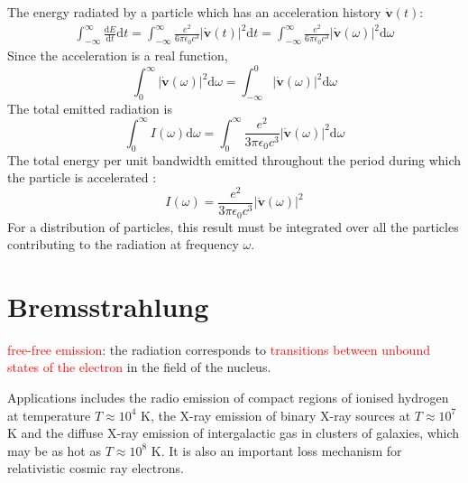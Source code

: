 \documentclass[12pt,a4paper]{article}
\renewcommand{\vec}[1]{\boldsymbol{#1}}
\newcommand{\dif}{\mathrm{d}}
\begin{document}
The energy radiated by a particle which has an acceleration history $\vec{\dot{v}}(t)$:
\begin{eqnarray}
\int_{-\infty}^{\infty} \frac{\dif E}{\dif t} \dif t = \int_{-\infty}^{\infty} \frac{e^2}{6\pi \epsilon_0 c^3} |\vec{\dot{v}}(t)|^2 \dif t = \int_{-\infty}^{\infty} \frac{e^2}{6\pi \epsilon_0 c^3} |\vec{\dot{v}}(\omega)|^2 \dif \omega
\end{eqnarray}
Since the acceleration is a real function,
\begin{equation*}
\int_{0}^{\infty} |\vec{\dot{v}}(\omega)|^2 \dif \omega = \int_{-\infty}^{0} |\vec{\dot{v}}(\omega)|^2 \dif \omega
\end{equation*}
The total emitted radiation is
\begin{equation}
\int_0^{\infty} I(\omega) \dif \omega = \int_{0}^{\infty} \frac{e^2}{3\pi \epsilon_0 c^3} |\vec{\dot{v}}(\omega)|^2 \dif \omega
\end{equation}
The total energy per unit bandwidth emitted throughout the period during which the particle is accelerated :
\begin{equation}
I(\omega) = \frac{e^2}{3\pi \epsilon_0 c^3} |\vec{\dot{v}}(\omega)|^2
\end{equation}
For a distribution of particles, this result must be integrated over all the particles contributing to the radiation at frequency $\omega$.




\section{Bremsstrahlung}
\textcolor{red}{free-free emission}: the radiation corresponds to \textcolor{red}{transitions between unbound states of the electron} in the field of the nucleus.

Applications includes the radio emission of compact regions of ionised hydrogen at temperature $T \approx 10^4$ K, the X-ray emission of binary X-ray sources at $T \approx 10^7$ K and the diffuse X-ray emission of intergalactic gas in clusters of galaxies, which may be as hot as $T \approx 10^8$ K. It is also an important loss mechanism for relativistic cosmic ray electrons.
\end{document}
